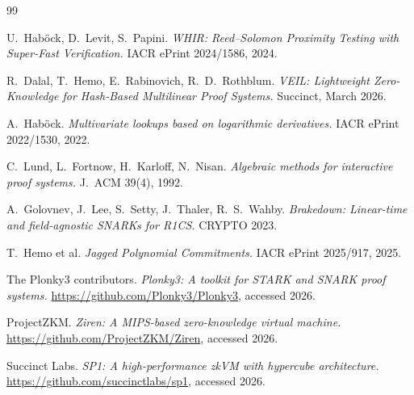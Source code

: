 \documentclass[11pt,a4paper]{article}
\theoremstyle{definition}
\theoremstyle{remark}
\begin{document}
\appendix




\begin{thebibliography}{99}

U.\ Hab\"ock, D.\ Levit, S.\ Papini.
\emph{WHIR: Reed--Solomon Proximity Testing with Super-Fast Verification.}
IACR ePrint 2024/1586, 2024.

R.\ Dalal, T.\ Hemo, E.\ Rabinovich, R.~D.~Rothblum.
\emph{VEIL: Lightweight Zero-Knowledge for Hash-Based Multilinear Proof Systems.}
Succinct, March 2026.

A.\ Haböck.
\emph{Multivariate lookups based on logarithmic derivatives.}
IACR ePrint 2022/1530, 2022.

C.\ Lund, L.\ Fortnow, H.\ Karloff, N.\ Nisan.
\emph{Algebraic methods for interactive proof systems.}
J.\ ACM 39(4), 1992.

A.\ Golovnev, J.\ Lee, S.\ Setty, J.\ Thaler, R.~S.~Wahby.
\emph{Brakedown: Linear-time and field-agnostic SNARKs for R1CS.}
CRYPTO 2023.

T.\ Hemo et al.
\emph{Jagged Polynomial Commitments.}
IACR ePrint 2025/917, 2025.

The Plonky3 contributors.
\emph{Plonky3: A toolkit for STARK and SNARK proof systems.}
\url{https://github.com/Plonky3/Plonky3}, accessed 2026.

ProjectZKM.
\emph{Ziren: A MIPS-based zero-knowledge virtual machine.}
\url{https://github.com/ProjectZKM/Ziren}, accessed 2026.

Succinct Labs.
\emph{SP1: A high-performance zkVM with hypercube architecture.}
\url{https://github.com/succinctlabs/sp1}, accessed 2026.

\end{thebibliography}
\end{document}
